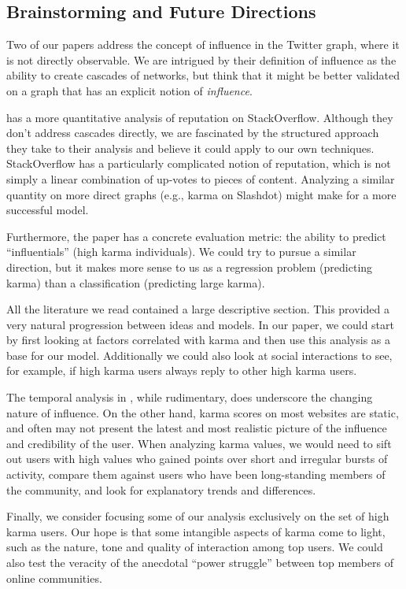 \documentclass[10pt]{article}
\begin{document}
\subsection{Brainstorming and Future Directions}

Two of our papers address the concept of influence in the Twitter graph, where
it is not directly observable. We are intrigued by their definition of influence
as the ability to create cascades of networks, but think that it might be better
validated on a graph that has an explicit notion of \textit{influence}.

\citet{movshovitzanalysis} has a more quantitative analysis of reputation on
StackOverflow.  Although they don't address cascades directly, we are fascinated 
by the structured approach they take to their analysis and believe it could apply
to our own techniques.  StackOverflow has a particularly complicated
notion of reputation, which is not simply a linear combination of up-votes to
pieces of content. Analyzing a similar quantity on more direct graphs (e.g.,
karma on Slashdot) might make for a more successful model.

Furthermore, the paper has a concrete evaluation metric: the ability to predict
``influentials'' (high karma individuals). We could try to pursue a similar
direction, but it makes more sense to us as a regression problem (predicting
karma) than a classification (predicting large karma).

All the literature we read contained a large descriptive section. This provided
a very natural progression between ideas and models. In our paper, we could
start by first looking at factors correlated with karma and then use this
analysis as a base for our model. Additionally we could also look at social
interactions to see, for example, if high karma users always reply to other high
karma users.

The temporal analysis in \citet{cha2010measuring}, while rudimentary, does
underscore the changing nature of influence. On the other hand, karma scores on
most websites are static, and often may not present the latest and most
realistic picture of the influence and credibility of the user. 
When analyzing karma values, we would need to sift out users with high values
who gained points over short and irregular bursts of activity, compare them
against users who have been long-standing members of the community, and look for
explanatory trends and differences.

Finally, we consider focusing some of our analysis exclusively on the set of
high karma users. Our hope is that some intangible aspects of karma come to
light, such as the nature, tone and quality of interaction among top users. We
could also test the veracity of the anecdotal ``power struggle'' between top
members of online communities.
\end{document}
